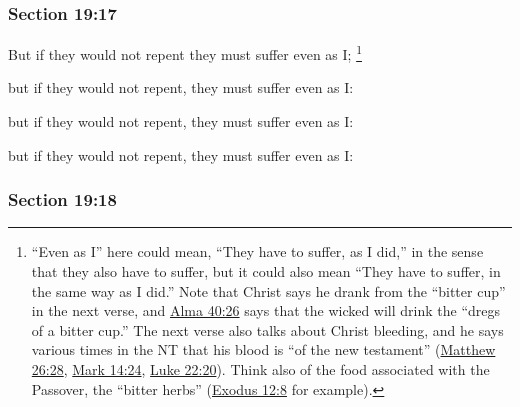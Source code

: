 	\subsubsection{Section 19:17} %
		\label{DC19-17}

		But if they would not repent they must suffer even as I;%
			\footnote{%
				``Even as I'' here could mean, ``They have to suffer, as I did,'' in the sense that they also have to suffer, but it could also mean ``They have to suffer, in the same way as I did.'' Note that Christ says he drank from the ``bitter cup'' in the next verse, and \hyperref[ALMA-40-26]{Alma 40:26} says that the wicked will drink the ``dregs of a bitter cup.'' The next verse also talks about Christ bleeding, and he says various times in the NT that his blood is ``of the new testament'' (\hyperref[MATTHEW-26-28]{Matthew 26:28}, \hyperref[MARK-14-24]{Mark 14:24}, \hyperref[LUKE-22-20]{Luke 22:20}). Think also of the food associated with the Passover, the ``bitter herbs'' (\hyperref[EXODUS-12-8]{Exodus 12:8} for example).
				}

		\begin{framed}
		\scriptsize
			\begin{compactdesc}
				\item[JSP] but if they would not repent, they must suffer even as I:
				\item[RB1] [\textit{missing}]
				\item[DC 1835] but if they would not repent, they must suffer even as I: 
				\item[DC 1844] but if they would not repent, they must suffer even as I: 
			\end{compactdesc}
		\end{framed}

	\subsubsection{Section 19:18} %
		\label{DC19-18}

